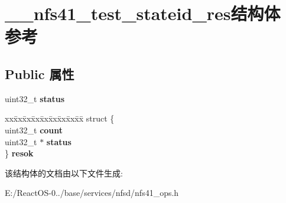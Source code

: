\hypertarget{struct____nfs41__test__stateid__res}{}\section{\+\_\+\+\_\+nfs41\+\_\+test\+\_\+stateid\+\_\+res结构体 参考}
\label{struct____nfs41__test__stateid__res}
\subsection*{Public 属性}
\begin{DoxyCompactItemize}
\item 
\mbox{\label{struct____nfs41__test__stateid__res_a9e47df7fd4a31bad65e53f4f24cd8e35}} 
uint32\+\_\+t {\bfseries status}
\item 
\mbox{\label{struct____nfs41__test__stateid__res_a33451d67668e80280b903754cad23649}} 
\begin{tabbing}
xx\=xx\=xx\=xx\=xx\=xx\=xx\=xx\=xx\=\kill
struct \{\\
\>uint32\_t {\bfseries count}\\
\>uint32\_t $\ast$ {\bfseries status}\\
\} {\bfseries resok}\\

\end{tabbing}\end{DoxyCompactItemize}


该结构体的文档由以下文件生成\+:\begin{DoxyCompactItemize}
\item 
E\+:/\+React\+O\+S-\/0../base/services/nfsd/nfs41\+\_\+ops.\+h\end{DoxyCompactItemize}
